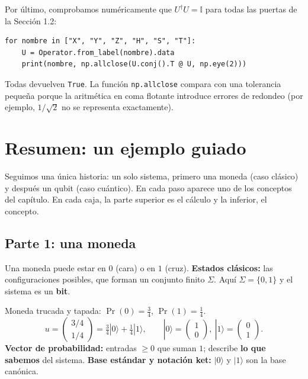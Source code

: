 \documentclass[11pt, a4paper, twoside, openright]{report}
\begin{document}
\noindent Por último, comprobamos numéricamente que $U^\dagger U = \mathbb{I}$ para todas las puertas de la Sección 1.2:
\begin{lstlisting}
for nombre in ["X", "Y", "Z", "H", "S", "T"]:
    U = Operator.from_label(nombre).data
    print(nombre, np.allclose(U.conj().T @ U, np.eye(2)))
\end{lstlisting}
\noindent Todas devuelven \texttt{True}. La función \texttt{np.allclose} compara con una tolerancia pequeña porque la aritmética en coma flotante introduce errores de redondeo (por ejemplo, $1/\sqrt2$ no se representa exactamente).

\providecommand{\pasoguiado}[3]{%
\begin{tcolorbox}[colback=gray!6!white,colframe=gray!55!black,fonttitle=\bfseries,title={#1}]
#2
\tcblower
\small #3
\end{tcolorbox}}

\cleardoublepage
\section{Resumen: un ejemplo guiado}

\noindent Seguimos una única historia: un solo sistema, primero una moneda (caso clásico) y después un qubit (caso cuántico). En cada paso aparece uno de los conceptos del capítulo. En cada caja, la parte superior es el cálculo y la inferior, el concepto.

\subsection{Parte 1: una moneda}

\pasoguiado{Paso 1. ¿En qué estados puede estar?}
{Una moneda puede estar en $0$ (cara) o en $1$ (cruz).}
{\textbf{Estados clásicos:} las configuraciones posibles, que forman un conjunto finito $\Sigma$. Aquí $\Sigma = \{0,1\}$ y el sistema es un \textbf{bit}.}

\pasoguiado{Paso 2. No sabemos cómo ha caído}
{Moneda trucada y tapada: $\Pr(0) = \frac34$, $\Pr(1) = \frac14$.
\[ u = \begin{pmatrix}3/4\\1/4\end{pmatrix} = \tfrac34|0\rangle + \tfrac14|1\rangle, \qquad |0\rangle = \begin{pmatrix}1\\0\end{pmatrix},\ |1\rangle = \begin{pmatrix}0\\1\end{pmatrix}. \]}
{\textbf{Vector de probabilidad:} entradas $\ge 0$ que suman $1$; describe \textbf{lo que sabemos} del sistema. \textbf{Base estándar y notación ket:} $|0\rangle$ y $|1\rangle$ son la base canónica.}
\end{document}
